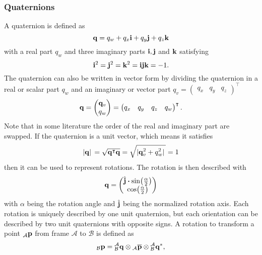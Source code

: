 \subsubsection{Quaternions}
A quaternion is defined as
\begin{equation}
    \vb{q} = q_w + q_x\vb{i} + q_y\vb{j} + q_z\vb{k}
\end{equation}
with a real part $q_w$ and three imaginary parts $\vb{i}, \vb{j}$ and $\vb{k}$ satisfying
\begin{equation}
    \vb{i}^2 = \vb{j}^2 = \vb{k}^2 = \vb{i}\vb{j}\vb{k} = -1.
\end{equation}
The quaternion can also be written in vector form by dividing the quaternion in a real or scalar part $q_w$ and an imaginary or vector part $q_v = \begin{pmatrix} q_x & q_y & q_z	\end{pmatrix}^\intercal$
\begin{equation}
    \vb{q} = \begin{pmatrix}
        \vb{q}_v \\
        q_w
    \end{pmatrix}
    =\begin{pmatrix}
        q_x & q_y & q_z & q_w
    \end{pmatrix}^\intercal.
\end{equation}
Note that in some literature the order of the real and imaginary part are swapped.
If the quaternion is a unit vector, which means it satisfies
\begin{equation}
    \abs*{\vb{q}} = \sqrt{\vb{q}^\intercal \vb{q}} = \sqrt{\abs*{\vb{q}_v^2 + q_w^2}} = 1
\end{equation}
then it can be used to represent rotations.
The rotation is then described with
\begin{equation}
    \label{eq:quaternion}
    \vb{q} =
    \begin{pmatrix}
        \hat{\vb{j}}\vdot\sin(\frac{\alpha}{2}) \\
        \cos(\frac{\alpha}{2})
    \end{pmatrix}
\end{equation}
with $\alpha$ being the rotation angle and $\hat{\vb{j}}$ being the normalized rotation axis.
Each rotation is uniquely described by one unit quaternion, but each orientation can be described by two unit quaternions with opposite signs.
A rotation to transform a point ${}_\mathcal{A}\vb{p}$ from frame $\mathcal{A}$ to $\mathcal{B}$ is defined as
\begin{equation}
    {}_\mathcal{B}\vb{p} = \qtf{a}{b} \otimes {}_\mathcal{A}\overline{\vb{p}} \otimes \qtf{a}{b}^*,
\end{equation}
